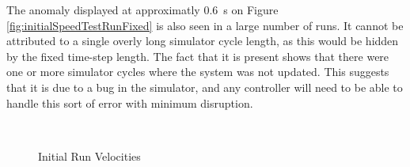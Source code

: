 \documentclass[10pt]{article}
\begin{document}
The anomaly displayed at approximatly \SI{0.6}{\second} on Figure
\ref{fig:initialSpeedTestRunFixed} is also seen in a large number of runs.  It
cannot be attributed to a single overly long simulator cycle length, as this
would be hidden by the fixed time-step length. The fact that it is present shows
that there were one or more simulator cycles where the system was not updated. 
This suggests that it is due to a bug in the simulator, and any controller will
need to be able to handle this sort of error with minimum disruption.

\begin{figure}
 \centering
 \\
 \caption{Initial Run Velocities}
 \label{fig:initialSpeedTestRun}
\end{figure}
\end{document}
